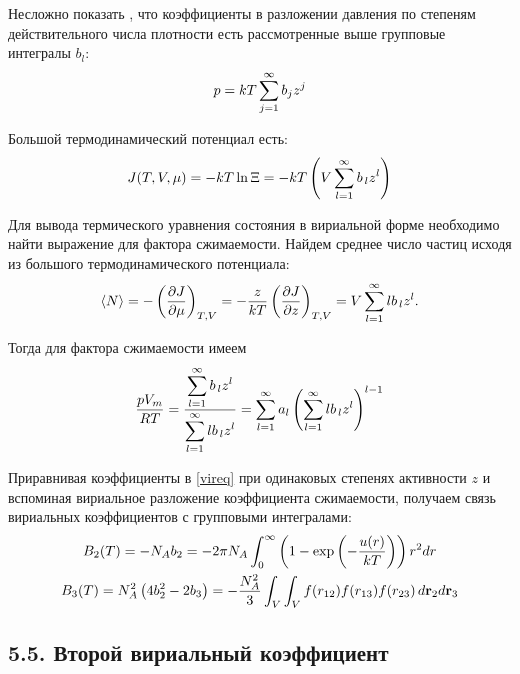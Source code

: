 Несложно показать \cite{meyson}, что коэффициенты в разложении давления по степеням действительного числа плотности есть рассмотренные выше групповые интегралы $b_l$: 
\vverh
\begin{gather}
	p = k T \sum_{j=1}^\infty b_j z^j \notag
\end{gather}

Большой термодинамический потенциал есть:
\vverh
\begin{gather}
	J(T, V, \mu) = - k T \ln \Xi = -k T \left( V \sum_{l=1}^\infty b_{\, l} z^l \right) \notag
\end{gather}

Для вывода термического уравнения состояния в вириальной форме необходимо найти выражение для фактора сжимаемости. Найдем среднее число частиц исходя из большого термодинамического потенциала:
\vverh
\begin{gather}
	\langle N \rangle = - \left( \frac{\partial J}{\partial \mu} \right)_{T, V} = - \frac{z}{kT} \left( \frac{\partial J}{\partial z} \right)_{T, V} = V \sum_{l = 1}^\infty l b_{\, l} z^l. \notag
\end{gather}

Тогда для фактора сжимаемости имеем
\vverh
\begin{gather}
	\frac{p V_m}{RT} = \frac{\displaystyle \sum_{l = 1}^\infty b_{\, l} z^l}{\displaystyle \sum_{l = 1}^\infty l b_{\, l} z^l} = \sum_{l = 1}^\infty a_l \left( \sum_{l = 1}^\infty  l b_{\, l} z^l \right)^{l - 1} \label{vireq}
\end{gather}

Приравнивая коэффициенты в \eqref{vireq} при одинаковых степенях активности $z$ и вспоминая вириальное разложение коэффициента сжимаемости, получаем связь вириальных коэффициентов с групповыми интегралами:
\vverh
\begin{gather}
	B_2(T) = - N_A b_2 = - 2 \pi N_A \int_0^\infty \left( 1 - \exp \left( -\frac{u(r)}{kT} \right) \right) r^2 d r \notag  \\
	B_3(T) = N_A^2 \left( 4 b_2^2 - 2 b_3 \right) = - \frac{N_A^2}{3} \int_V \int_V f(r_{12}) f(r_{13}) f(r_{23}) \, d \mathbf{r}_2 d \mathbf{r}_3 \notag
\end{gather}
\fi

\subsection*{\textbf{5.5.} Второй вириальный коэффициент \cite{hirsch, meyson}}

